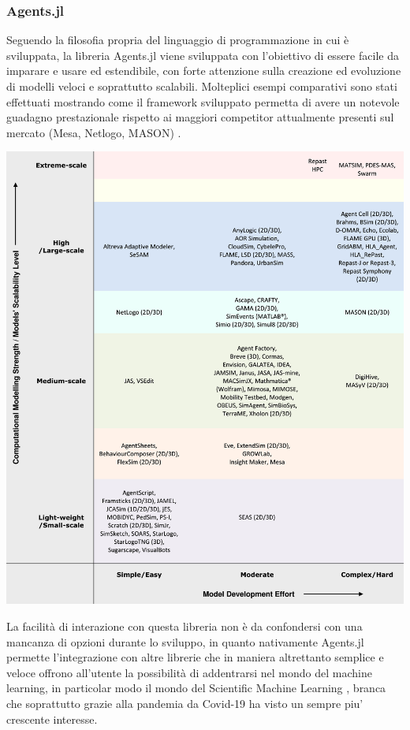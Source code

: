 \subsubsection{Agents.jl}
Seguendo la filosofia propria del linguaggio di programmazione 
in cui è sviluppata, la libreria Agents.jl \cite{Agents.jl} 
viene sviluppata con l’obiettivo di essere facile da imparare e 
usare ed estendibile, con forte attenzione sulla creazione ed 
evoluzione di modelli veloci e soprattutto scalabili. 
Molteplici esempi comparativi sono stati effettuati mostrando 
come il framework sviluppato permetta di avere un notevole 
guadagno prestazionale rispetto ai maggiori competitor 
attualmente presenti sul mercato (Mesa, Netlogo, MASON) 
\cite{ABAR201713}.

\begin{minipage}{\linewidth}
    \centering
    \includegraphics[width=\textwidth]{img/1-s2.0-S1574013716301198-gr1_lrg.jpg}
    \label{fig:Comparative_table}
\end{minipage}

La facilità di interazione con questa libreria non è da 
confondersi con una mancanza di opzioni durante lo sviluppo, 
in quanto nativamente Agents.jl permette l’integrazione con 
altre librerie che in maniera altrettanto semplice e veloce 
offrono all’utente la possibilità 
di addentrarsi nel mondo del machine learning, in particolar 
modo il mondo del Scientific Machine Learning 
\cite{rackauckas2017differentialequations}, 
branca che soprattutto grazie alla pandemia da Covid-19 ha 
visto un sempre piu' crescente interesse. 

